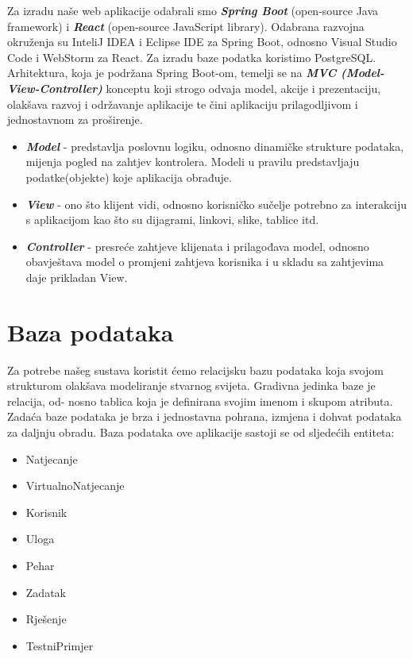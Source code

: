 Za izradu naše web aplikacije odabrali smo \textit{\textbf{Spring Boot}} (open-source Java framework) i \textit{\textbf{React}} (open-source JavaScript library). Odabrana razvojna okruženja su InteliJ IDEA i Eclipse IDE za Spring Boot, odnosno Visual Studio Code i WebStorm za React. Za izradu baze podatka koristimo PostgreSQL.
Arhitektura, koja je podržana Spring Boot-om, temelji se na \textit{\textbf{MVC (Model-View-Controller)}} konceptu koji strogo odvaja model, akcije i prezentaciju, olakšava razvoj i održavanje aplikacije te čini aplikaciju prilagodljivom i jednostavnom za proširenje.
\begin{itemize}
	\item \textit{\textbf{Model}} - predstavlja poslovnu logiku, odnosno dinamičke strukture podataka, mijenja pogled na zahtjev kontrolera. Modeli u pravilu predstavljaju podatke(objekte) koje aplikacija obrađuje.
	\item \textit{\textbf{View}} - ono što klijent vidi, odnosno korisničko sučelje potrebno za interakciju s aplikacijom kao što su dijagrami, linkovi, slike, tablice itd.
	\item \textit{\textbf{Controller}} - presreće zahtjeve klijenata i prilagođava model, odnosno obavještava model o promjeni zahtjeva korisnika i u skladu sa zahtjevima daje prikladan View.
\end{itemize}

\section{Baza podataka}
			
Za potrebe našeg sustava koristit ćemo relacijsku bazu podataka koja svojom strukturom olakšava modeliranje stvarnog svijeta. Gradivna jedinka baze je relacija, od- nosno tablica koja je definirana svojim imenom i skupom atributa. Zadaća baze podataka je brza i jednostavna pohrana, izmjena i dohvat podataka za daljnju obradu. Baza podataka ove aplikacije sastoji se od sljedećih entiteta:
\begin{itemize}
	\item Natjecanje
	\item VirtualnoNatjecanje
	\item Korisnik
	\item Uloga
	\item Pehar
	\item Zadatak
	\item Rješenje
	\item TestniPrimjer		
\end{itemize}
				
